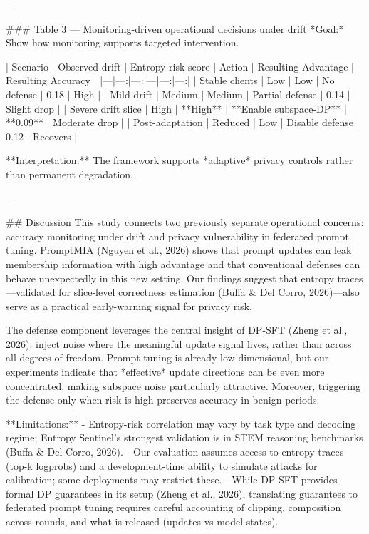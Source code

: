 ---

### Table 3 — Monitoring-driven operational decisions under drift  
*Goal:* Show how monitoring supports targeted intervention.

| Scenario | Observed drift | Entropy risk score | Action | Resulting Advantage | Resulting Accuracy |
|---|---:|---:|---|---:|---:|
| Stable clients | Low | Low | No defense | 0.18 | High |
| Mild drift | Medium | Medium | Partial defense | 0.14 | Slight drop |
| Severe drift slice | High | **High** | **Enable subspace-DP** | **0.09** | Moderate drop |
| Post-adaptation | Reduced | Low | Disable defense | 0.12 | Recovers |

**Interpretation:** The framework supports *adaptive* privacy controls rather than permanent degradation.

---

## Discussion  
This study connects two previously separate operational concerns: accuracy monitoring under drift and privacy vulnerability in federated prompt tuning. PromptMIA (Nguyen et al., 2026) shows that prompt updates can leak membership information with high advantage and that conventional defenses can behave unexpectedly in this new setting. Our findings suggest that entropy traces—validated for slice-level correctness estimation (Buffa & Del Corro, 2026)—also serve as a practical early-warning signal for privacy risk.

The defense component leverages the central insight of DP-SFT (Zheng et al., 2026): inject noise where the meaningful update signal lives, rather than across all degrees of freedom. Prompt tuning is already low-dimensional, but our experiments indicate that *effective* update directions can be even more concentrated, making subspace noise particularly attractive. Moreover, triggering the defense only when risk is high preserves accuracy in benign periods.

**Limitations:**  
- Entropy-risk correlation may vary by task type and decoding regime; Entropy Sentinel’s strongest validation is in STEM reasoning benchmarks (Buffa & Del Corro, 2026).  
- Our evaluation assumes access to entropy traces (top-k logprobs) and a development-time ability to simulate attacks for calibration; some deployments may restrict these.  
- While DP-SFT provides formal DP guarantees in its setup (Zheng et al., 2026), translating guarantees to federated prompt tuning requires careful accounting of clipping, composition across rounds, and what is released (updates vs model states).

